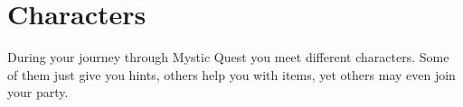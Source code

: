 \chapter{Characters}

During your journey through Mystic Quest you meet different characters. Some of them just give you hints, others help you with items, yet others may even join your party.

\newpage

\newpage

\newpage

\newpage

\newpage

\newpage

\newpage

\newpage

\newpage

\newpage

